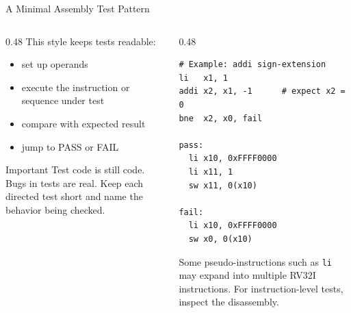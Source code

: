 \documentclass[aspectratio=169,10pt]{beamer}
\begin{document}
\begin{frame}[fragile]{A Minimal Assembly Test Pattern}
  \begin{columns}[T]
    \begin{column}{0.48\textwidth}
      This style keeps tests readable:
      \begin{itemize}
        \item set up operands
        \item execute the instruction or sequence under test
        \item compare with expected result
        \item jump to PASS or FAIL
      \end{itemize}

      \vspace{0.8em}
      \begin{block}{Important}
        Test code is still code. Bugs in tests are real. Keep each directed test short and name the behavior being checked.
      \end{block}
    \end{column}
    \begin{column}{0.48\textwidth}
\begin{lstlisting}[language=Shell]
# Example: addi sign-extension
li   x1, 1
addi x2, x1, -1      # expect x2 = 0
bne  x2, x0, fail

pass:
  li x10, 0xFFFF0000
  li x11, 1
  sw x11, 0(x10)

fail:
  li x10, 0xFFFF0000
  sw x0, 0(x10)
\end{lstlisting}
      \vspace{0.4em}
      \small
      Some pseudo-instructions such as \texttt{li} may expand into multiple RV32I instructions. For instruction-level tests, inspect the disassembly.
    \end{column}
  \end{columns}
\end{frame}
\end{document}
